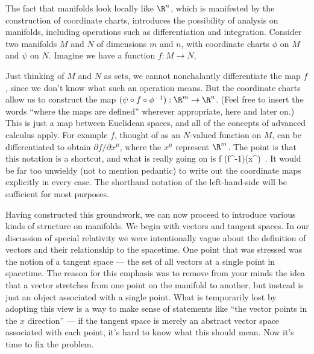 The fact that manifolds look locally like $\R^n$, which is manifested
by the construction of coordinate charts, introduces the possibility
of analysis on manifolds, including operations such as differentiation
and integration.  Consider two manifolds $M$ and $N$ of dimensions
$m$ and $n$, with coordinate charts $\phi$ on $M$ and $\psi$ on $N$.
Imagine we have a function $f:M\rightarrow N$,

\begin{figure}[h]
  \centerline{
  }
\end{figure}

\noindent Just thinking of $M$ and $N$ as sets, we cannot nonchalantly
differentiate the map $f$, since we don't know what such an operation
means.  But the coordinate charts allow us to construct the map
$(\psi\circ f\circ\phi^{-1}):\R^m\rightarrow\R^n$.  (Feel free to
insert the words ``where the maps are defined'' wherever appropriate,
here and later on.)  This is just
a map between Euclidean spaces, and all of the concepts of advanced
calculus apply.  For example $f$, thought of as an $N$-valued
function on $M$, can be differentiated to obtain ${\partial f}/
{\partial x^\mu}$, where the $x^\mu$ represent $\R^m$.
The point is that this notation is a shortcut, and what is really
going on is
\be
  {{\partial f}} 
  (\psi\circ f\circ\phi^{-1})(x^{\mu})\ .\label{2.7}
\ee
It would be far too unwieldy (not to mention pedantic) to write out
the coordinate maps explicitly in every case.  The shorthand notation
of the left-hand-side will be sufficient for most purposes.

Having constructed this groundwork, we can now proceed to introduce
various kinds of structure on manifolds.  We begin with vectors and
tangent spaces.  In our discussion of special relativity we were
intentionally vague about the definition of vectors and their 
relationship to the spacetime.  One point that was stressed was the
notion of a tangent space --- the set of all vectors at a single
point in spacetime.  The reason for this emphasis was to remove from
your minds the idea that a vector stretches from one point on the
manifold to another, but instead is just an object associated with
a single point.  What is temporarily lost by adopting this view is
a way to make sense of statements like ``the vector points in the
$x$ direction'' --- if the tangent space is merely an abstract vector
space associated with each point, it's hard to know what this should
mean.  Now it's time to fix the problem.

